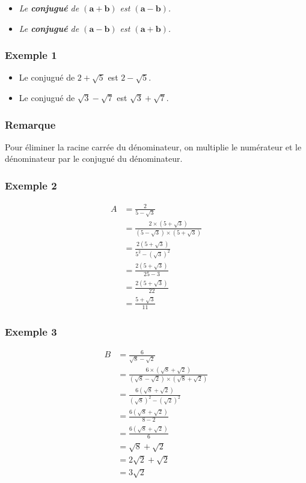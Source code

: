 \documentclass[12pt,a4paper]{article}
\begin{document}
\vspace{0.2cm}
\begin{itemize}
    \item[\small$\blacktriangleright$] \textit{Le \textbf{conjugué} de $\mathbf{(a + b)}$ est $\mathbf{(a - b)}$.}
    \item[\small$\blacktriangleright$] \textit{Le \textbf{conjugué} de $\mathbf{(a - b)}$ est $\mathbf{(a + b)}$.}
\end{itemize}
\subsubsection*{\color{myred} Exemple 1}
\begin{itemize}[label=\textcolor{teal}{$\blacktriangleright$}]
    \item Le conjugué de $2 + \sqrt{5}$ est $2 - \sqrt{5}$.
    \item Le conjugué de $\sqrt{3} - \sqrt{7}$ est $\sqrt{3} + \sqrt{7}$.
\end{itemize}
\subsubsection*{\color{myred} Remarque }
Pour éliminer la racine carrée du dénominateur, on multiplie le numérateur et le dénominateur par
le conjugué du dénominateur.
\subsubsection*{\color{myred} Exemple 2}
\[
\begin{aligned}
A &= \frac{2}{5 - \sqrt{3}}\\ 
&= \frac{2 \times \left(5 + \sqrt{3}\right)}{\left(5 - \sqrt{3}\right) \times \left(5 + \sqrt{3}\right)}\\ 
&= \frac{2 \left(5 + \sqrt{3}\right)}{5^2 - \left(\sqrt{3}\right)^2} \\
&= \frac{2 \left(5 + \sqrt{3}\right)}{25 - 3}\\ &= \frac{2 \left(5 + \sqrt{3}\right)}{22}\\ 
&= \frac{5 + \sqrt{3}}{11}
\end{aligned}
\]
\subsubsection*{\color{myred} Exemple 3}
\[
\begin{aligned}
B &= \frac{6}{\sqrt{8} - \sqrt{2}}\\ &= \frac{6 \times \left(\sqrt{8} + \sqrt{2}\right)}{\left(\sqrt{8} - \sqrt{2}\right) \times \left(\sqrt{8} + \sqrt{2}\right)}\\ &= \frac{6 \left(\sqrt{8} + \sqrt{2}\right)}{\left(\sqrt{8}\right)^2 - \left(\sqrt{2}\right)^2} \\
&= \frac{6 \left(\sqrt{8} + \sqrt{2}\right)}{8 - 2}\\ &= \frac{6 \left(\sqrt{8} + \sqrt{2}\right)}{6}\\ &= \sqrt{8} + \sqrt{2}\\ &= 2\sqrt{2} + \sqrt{2}\\ &= 3\sqrt{2}
\end{aligned}
\]
\end{document}
